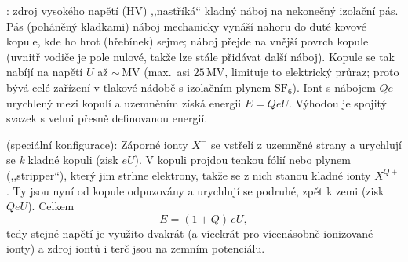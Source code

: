 \begin{center}
\end{center}

: zdroj vysokého napětí (HV) ,,nastříká`` kladný náboj na
nekonečný izolační pás. Pás (poháněný kladkami) náboj mechanicky vynáší nahoru do duté kovové
kopule, kde ho hrot (hřebínek) sejme; náboj přejde na vnější povrch kopule (uvnitř vodiče je
pole nulové, takže lze stále přidávat další náboj). Kopule se tak nabíjí na napětí \(U\) až
\(\sim\)\,MV (max.\ asi \(25\,\mathrm{MV}\), limituje to elektrický průraz; proto bývá celé
zařízení v tlakové nádobě s izolačním plynem \(\mathrm{SF_6}\)). Iont s nábojem \(Qe\) urychlený
mezi kopulí a uzemněním získá energii \(E = QeU\). Výhodou je spojitý svazek s velmi přesně
definovanou energií.

 (speciální konfigurace): Záporné ionty \(X^-\) se vstřelí z uzemněné strany a
urychlují se \emph{k} kladné kopuli (zisk \(eU\)). V kopuli projdou tenkou fólií nebo plynem
(,,stripper``), který jim strhne elektrony, takže se z nich stanou kladné ionty \(X^{Q+}\).
Ty jsou nyní od kopule odpuzovány a urychlují se podruhé, zpět k zemi (zisk \(QeU\)). Celkem
\[
  E = (1+Q)\,eU ,
\]
tedy stejné napětí je využito dvakrát (a vícekrát pro vícenásobně ionizované ionty) a zdroj
iontů i terč jsou na zemním potenciálu.

